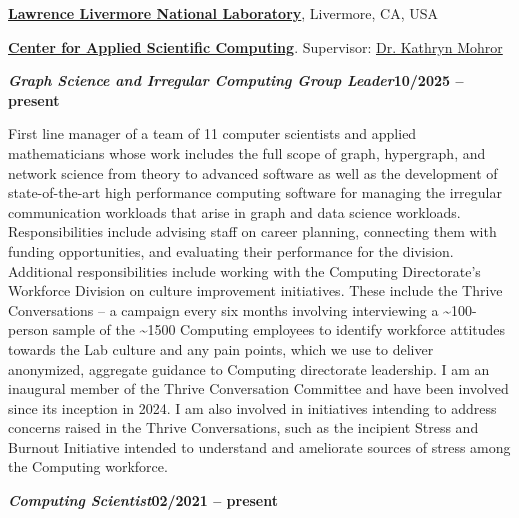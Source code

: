 \href{https://www.llnl.gov/}{\textbf{Lawrence Livermore National Laboratory}},
Livermore, CA, USA

\href{https://computation.llnl.gov/casc/}{\textbf{Center for Applied Scientific Computing}}.
Supervisor:
\href{https://people.llnl.gov/mohror1}{Dr. Kathryn Mohror}

\vspace{-0.5em}

\begin{outerlist}

  \vspace{-0.5em}

  \item[] \textbf{\textit{Graph Science and Irregular Computing Group Leader}}\hfill \textbf{10/2025 -- present}

  \vspace{-0.5em}

  First line manager of a team of 11 computer scientists and applied mathematicians whose work includes the full scope of graph, hypergraph, and network science from theory to advanced software as well as the development of state-of-the-art high performance computing software for managing the irregular communication workloads that arise in graph and data science workloads.
  Responsibilities include advising staff on career planning, connecting them with funding opportunities, and evaluating their performance for the division.
  Additional responsibilities include working with the Computing Directorate's Workforce Division on culture improvement initiatives.
  These include the Thrive Conversations -- a campaign every six months involving interviewing a \textasciitilde{}100-person sample of the \textasciitilde{}1500 Computing employees to identify workforce attitudes towards the Lab culture and any pain points, which we use to deliver anonymized, aggregate guidance to Computing directorate leadership.
  I am an inaugural member of the Thrive Conversation Committee and have been involved since its inception in 2024.
  I am also involved in initiatives intending to address concerns raised in the Thrive Conversations, such as the incipient Stress and Burnout Initiative intended to understand and ameliorate sources of stress among the Computing workforce.

  \vspace{-0.5em}

  \item[] \textbf{\textit{Computing Scientist}}\hfill \textbf{02/2021 -- present}


\end{outerlist}
